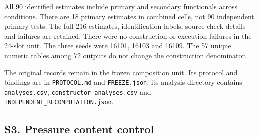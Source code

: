 \documentclass[11pt,letterpaper]{article}
\begin{document}
\endgroup

All 90 identified estimates include primary and secondary functionals across conditions. There are 18 primary estimates in combined cells, not 90 independent primary tests. The full 216 estimates, identification labels, source-check details and failures are retained. There were no construction or execution failures in the 24-slot unit. The three seeds were 16101, 16103 and 16109. The 57 unique numeric tables among 72 outputs do not change the construction denominator.


The original records remain in the frozen composition unit. Its protocol and bindings are in \texttt{PROTOCOL.md} and \texttt{FREEZE.json}; its analysis directory contains \texttt{analyses.csv}, \texttt{constructor\_\allowbreak{}analyses.csv} and \texttt{INDEPENDENT\_\allowbreak{}RECOMPUTATION.json}.


\FloatBarrier


\subsection*{S3. Pressure content control}

\FloatBarrier

\begingroup

\small

\renewcommand{\arraystretch}{1.22}
\end{document}
